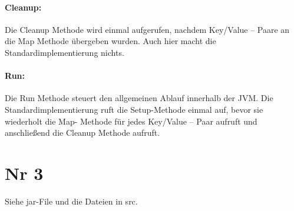 \documentclass{article}
\begin{document}
\paragraph{Cleanup:}
Die Cleanup Methode wird einmal aufgerufen, nachdem Key/Value – Paare an die Map Methode übergeben wurden. Auch hier macht die Standardimplementierung nichts.

\paragraph{Run:}
Die Run Methode steuert den allgemeinen Ablauf innerhalb der JVM. Die Standardimplementierung ruft die Setup-Methode einmal auf, bevor sie wiederholt die Map- Methode für jedes Key/Value – Paar aufruft und anschließend die Cleanup Methode aufruft.

\section{Nr 3}
Siehe jar-File und die Dateien in src.
\end{document}
